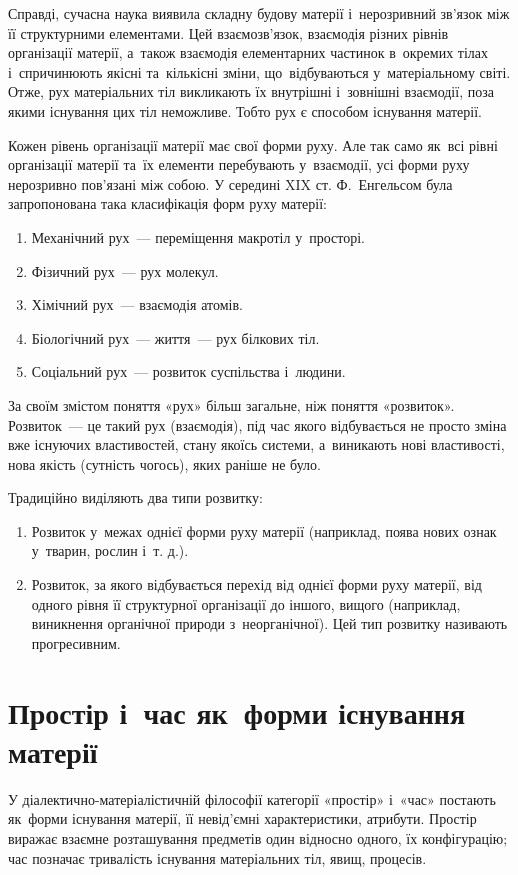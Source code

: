 \documentclass[a5paper,oneside,DIV=12,12pt,headings=small]{scrartcl}
\begin{document}
		Справді, сучасна наука виявила складну будову матерії і~нерозривний зв'язок між її структурними елементами. Цей вза\-є\-мо\-зв'язок, взаємодія різних рівнів організації матерії, а~також взаємодія елементарних частинок в~окремих тілах і~спричинюють якісні та~кількісні зміни, що~відбуваються у~матеріальному світі. Отже, рух матеріальних тіл викликають їх внутрішні і~зовнішні взаємодії, поза якими існування цих тіл неможливе. Тобто рух є способом існування матерії.
		
		Кожен рівень організації матерії має свої форми руху. Але так само як~всі рівні організації матерії та~їх елементи перебувають у~взаємодії, усі форми руху нерозривно пов'\-яз\-а\-ні між собою. У середині XIX ст. Ф. Енгельсом була запропонована така класифікація форм руху матерії:
		\begin{enumerate}
			\item Механічний рух~— переміщення макротіл у~просторі.
			\item Фізичний рух~— рух молекул.
			\item Хімічний рух~— взаємодія атомів.
			\item Біологічний рух~— життя~— рух білкових тіл.
			\item Соціальний рух~— розвиток суспільства і~людини.
		\end{enumerate}
		
		За своїм змістом поняття «рух» більш загальне, ніж поняття «розвиток». Розвиток~— це такий рух (взаємодія), під час якого відбувається не просто зміна вже існуючих властивостей, стану якоїсь системи, а~виникають нові властивості, нова якість (сутність чогось), яких раніше не було.
		
		Традиційно виділяють два типи розвитку:
		\begin{enumerate}
			\item Розвиток у~межах однієї форми руху матерії (наприклад, поява нових ознак у~тварин, рослин і~т. д.).
			\item Розвиток, за якого відбувається перехід від однієї форми руху матерії, від одного рівня її структурної організації до іншого, вищого (наприклад, виникнення органічної природи з~неорганічної). Цей тип розвитку називають прогресивним.
		\end{enumerate}
		
	\section{Простір і~час як~форми існування матерії}
		У діалектично-матеріалістичній філософії категорії «простір» і~«час» постають як~форми існування матерії, її не\-від'\-єм\-ні характеристики, атрибути. Простір виражає взаємне розташування предметів один відносно одного, їх конфігурацію; час позначає тривалість існування матеріальних тіл, явищ, процесів.
		
\end{document}
